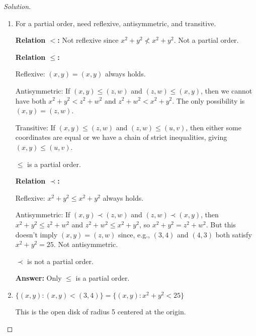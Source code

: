 \documentclass[12pt]{article}
\begin{document}
\begin{proof}[Solution]
~
\begin{enumerate}[label=(\alph*)]
    \item For a partial order, need reflexive, antisymmetric, and transitive.
    
    \textbf{Relation $<$:} Not reflexive since $x^2 + y^2 \not< x^2 + y^2$. Not a partial order.
    
    \textbf{Relation $\leq$:} 
    
    Reflexive: $(x,y) = (x,y)$ always holds.
    
    Antisymmetric: If $(x,y) \leq (z,w)$ and $(z,w) \leq (x,y)$, then we cannot have both $x^2 + y^2 < z^2 + w^2$ and $z^2 + w^2 < x^2 + y^2$. The only possibility is $(x,y) = (z,w)$.
    
    Transitive: If $(x,y) \leq (z,w)$ and $(z,w) \leq (u,v)$, then either some coordinates are equal or we have a chain of strict inequalities, giving $(x,y) \leq (u,v)$.
    
    $\leq$ is a partial order.
    
    \textbf{Relation $\prec$:}
    
    Reflexive: $x^2 + y^2 \leq x^2 + y^2$ always holds.
    
    Antisymmetric: If $(x,y) \prec (z,w)$ and $(z,w) \prec (x,y)$, then $x^2 + y^2 \leq z^2 + w^2$ and $z^2 + w^2 \leq x^2 + y^2$, so $x^2 + y^2 = z^2 + w^2$. But this doesn't imply $(x,y) = (z,w)$ since, e.g., $(3,4)$ and $(4,3)$ both satisfy $x^2 + y^2 = 25$. Not antisymmetric.
    
    $\prec$ is not a partial order.
    
    \textbf{Answer:} Only $\leq$ is a partial order.
    
    \setcounter{enumi}{2}
    
    \item $\{(x,y) : (x,y) < (3,4)\} = \{(x,y) : x^2 + y^2 < 25\}$

    This is the open disk of radius 5 centered at the origin.

    \begin{center}
\end{center}
\end{enumerate}
\end{proof}
\end{document}

